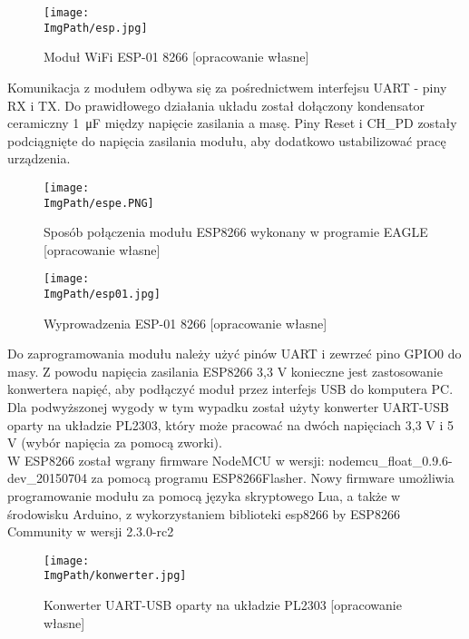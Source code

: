 \documentclass[a4paper,12pt,twoside,openany]{report}
\newcommand{\ImgPath}{.}
\begin{document}
\begin{figure}[!htbp]
	\begin{center}
\centering
\texttt{[image: \\ImgPath/esp.jpg]}
\end{center}
	\caption{Moduł WiFi ESP-01 8266 [opracowanie własne]}
	\label{schematKomunikacji}
\end{figure}

Komunikacja z modułem odbywa się za pośrednictwem interfejsu UART - piny RX i TX. Do prawidłowego działania układu został dołączony kondensator ceramiczny \SI{1}{\micro F} między napięcie zasilania a masę. Piny Reset i CH\_PD zostały podciągnięte do napięcia zasilania modułu, aby dodatkowo ustabilizować pracę urządzenia.

\newpage

\begin{figure}[!htbp]
	\begin{center}
\centering
\texttt{[image: \\ImgPath/espe.PNG]}
\end{center}
	\caption{Sposób połączenia modułu ESP8266 wykonany w programie EAGLE [opracowanie własne]}
	\label{schematKomunikacji}
\end{figure}

\begin{figure}[!htbp]
	\begin{center}
\centering
\texttt{[image: \\ImgPath/esp01.jpg]}
\end{center}
	\caption{Wyprowadzenia ESP-01 8266 [opracowanie własne]}
	\label{schematKomunikacji}
\end{figure}

Do zaprogramowania modułu należy użyć pinów UART i zewrzeć pino GPIO0 do masy. Z powodu napięcia zasilania ESP8266 3,3 V konieczne jest zastosowanie konwertera napięć, aby podłączyć moduł przez interfejs USB do komputera PC. Dla podwyższonej wygody w tym wypadku został użyty konwerter UART-USB oparty na układzie PL2303, który może pracować na dwóch napięciach 3,3 V i 5 V (wybór napięcia za pomocą zworki).\\
W ESP8266 został wgrany firmware NodeMCU w wersji: nodemcu\_float\_0.9.6-dev\_20150704 za pomocą programu ESP8266Flasher. Nowy firmware umożliwia programowanie modułu za pomocą języka skryptowego Lua, a także w środowisku Arduino, z wykorzystaniem biblioteki esp8266 by ESP8266 Community w wersji 2.3.0-rc2

\newpage

\begin{figure}[!htbp]
	\begin{center}
\centering
\texttt{[image: \\ImgPath/konwerter.jpg]}
\end{center}
	\caption{Konwerter UART-USB oparty na układzie PL2303 [opracowanie własne]}
	\label{schematKomunikacji}
\end{figure}
\end{document}

